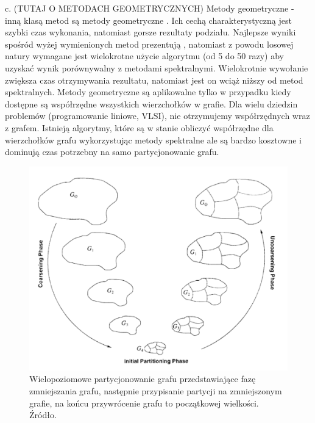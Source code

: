 c. (TUTAJ O METODACH GEOMETRYCZNYCH) Metody geometryczne - inną klasą metod są metody geometryczne \cite{Miller1994ACP, Raghavan93lineand, 185417, MiTeThVa93, NourOmid1987SolvingFE}.
Ich cechą charakterystyczną jest szybki czas wykonania, natomiast gorsze rezultaty podziału.
Najlepsze wyniki spośród wyżej wymienionych metod prezentują \cite{185417, MiTeThVa93}, natomiast z powodu
losowej natury wymagane jest wielokrotne użycie algorytmu (od 5 do 50 razy) aby uzyskać wynik porównywalny
z metodami spektralnymi. Wielokrotnie wywołanie zwiększa czas otrzymywania rezultatu, natomiast jest
on wciąż niższy od metod spektralnych. Metody geometryczne są aplikowalne tylko w przypadku kiedy dostępne
są współrzędne wszystkich wierzchołków w grafie. Dla wielu dziedzin problemów (programowanie liniowe, VLSI),
nie otrzymujemy współrzędnych wraz z grafem. Istnieją algorytmy, które są w stanie obliczyć współrzędne dla
wierzchołków grafu \cite{Chan95geometricspectral} wykorzystując metody spektralne ale są bardzo kosztowne i dominują czas potrzebny
na samo partycjonowanie grafu.
\newline\newline

\begin{figure}
    \vspace{-4mm}
    \includegraphics[width=\linewidth]{images/coarsening}
    \caption{Wielopoziomowe partycjonowanie grafu przedstawiające fazę zmniejszania grafu, następnie przypisanie
    partycji na zmniejszonym grafie, na końcu przywrócenie grafu to początkowej wielkości.
    Źródło\cite{KARYPIS199896}.}
    \label{fig:1}
\end{figure}

